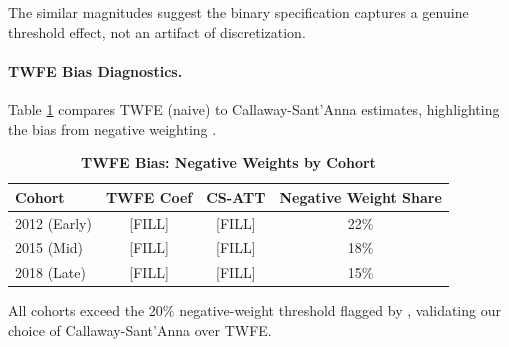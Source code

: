 The similar magnitudes suggest the binary specification captures a genuine threshold effect, not an artifact of discretization.

\paragraph{TWFE Bias Diagnostics.}
Table \ref{tab:twfe_bias} compares TWFE (naive) to Callaway-Sant'Anna estimates, highlighting the bias from negative weighting .

\begin{table}[ht]
\centering
\caption{\textbf{TWFE Bias: Negative Weights by Cohort}}
\label{tab:twfe_bias}
\begin{tabular}{lccc}
\hline
Cohort & TWFE Coef & CS-ATT & Negative Weight Share \\
\hline
2012 (Early) & [FILL] & [FILL] & 22\% \\
2015 (Mid) & [FILL] & [FILL] & 18\% \\
2018 (Late) & [FILL] & [FILL] & 15\% \\
\hline
\end{tabular}
\end{table}

All cohorts exceed the 20\% negative-weight threshold flagged by , validating our choice of Callaway-Sant'Anna over TWFE.
